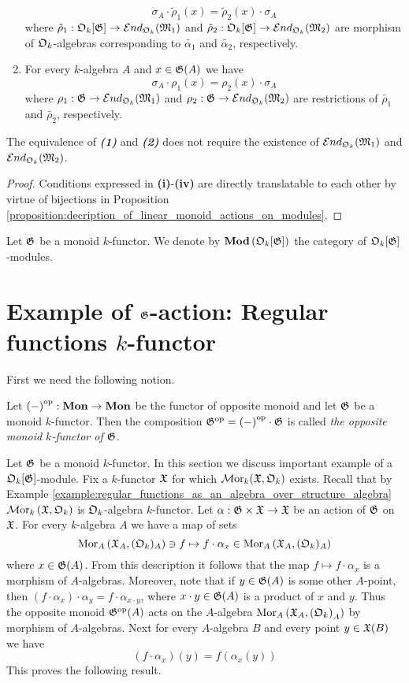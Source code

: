 \begin{proposition}
\begin{enumerate}[label=\emph{\textbf{(\roman*)}}, leftmargin=1.5em]
$$\sigma_A \cdot \tilde{\rho}_1(x) = \tilde{\rho}_2(x) \cdot \sigma_A$$
where $\tilde{\rho}_1:{\mathfrak O}_k[{\mathfrak G}] \rightarrow {\mathcal E} nd_{{\mathfrak O}_k}({\mathfrak M}_1)$ and $\tilde{\rho}_2:{\mathfrak O}_k[{\mathfrak G}] \rightarrow {\mathcal E} nd_{{\mathfrak O}_k}({\mathfrak M}_2)$ are morphism of ${\mathfrak O}_k$-algebras corresponding to $\tilde{\alpha_1}$ and $\tilde{\alpha_2}$, respectively.
\item For every $k$-algebra $A$ and $x\in {\mathfrak G}(A)$ we have
$$\sigma_A \cdot \rho_1(x) = \rho_2(x) \cdot \sigma_A$$
where $\rho_1:{\mathfrak G} \rightarrow {\mathcal E} nd_{{\mathfrak O}_k}({\mathfrak M}_1)$ and $\rho_2:{\mathfrak G} \rightarrow {\mathcal E} nd_{{\mathfrak O}_k}({\mathfrak M}_2)$ are restrictions of $\tilde{\rho_1}$ and $\tilde{\rho_2}$, respectively.
\end{enumerate}
The equivalence of \emph{\textbf{(1)}} and \emph{\textbf{(2)}} does not require the existence of ${\mathcal E} nd_{{\mathfrak O}_k}({\mathfrak M}_1)$ and ${\mathcal E} nd_{{\mathfrak O}_k}({\mathfrak M}_2)$.
\end{proposition}
\begin{proof}
Conditions expressed in \textbf{(i)}-\textbf{(iv)} are directly translatable to each other by virtue of bijections in Proposition \ref{proposition:decription_of_linear_monoid_actions_on_modules}. 
\end{proof}
\noindent
Let ${\mathfrak G}$ be a monoid $k$-functor. We denote by $\mathbf{Mod}\left({\mathfrak O}_k[{\mathfrak G}]\right)$ the category of ${\mathfrak O}_k[{\mathfrak G}]$-modules.

\section{Example of ${\mathfrak G}$-action: Regular functions $k$-functor}
\noindent
First we need the following notion.

\begin{definition}
Let $\left(-\right)^{\mathrm{op}}:\mathbf{Mon} \rightarrow \mathbf{Mon}$ be the functor of opposite monoid and let ${\mathfrak G}$ be a monoid $k$-functor. Then the composition ${\mathfrak G}^{\mathrm{op}} = \left(-\right)^{\mathrm{op}}\cdot {\mathfrak G}$ is called \textit{the opposite monoid $k$-functor of ${\mathfrak G}$}.
\end{definition}
\noindent
Let ${\mathfrak G}$ be a monoid $k$-functor. In this section we discuss important example of a ${\mathfrak O}_k[{\mathfrak G}]$-module. Fix a $k$-functor ${\mathfrak X}$ for which $\mathcal{M}\mathrm{or}_k({\mathfrak X},{\mathfrak O}_k)$ exists. Recall that by Example \ref{example:regular_functions_as_an_algebra_over_structure_algebra} $\mathcal{M}\mathrm{or}_k\left({\mathfrak X},{\mathfrak O}_k\right)$ is ${\mathfrak O}_k$-algebra $k$-functor. Let $\alpha:{\mathfrak G}\times {\mathfrak X}\rightarrow {\mathfrak X}$ be an action of ${\mathfrak G}$ on ${\mathfrak X}$. For every $k$-algebra $A$  we have a map of sets
$$\mathrm{Mor}_A\left({\mathfrak X}_A,({\mathfrak O}_k)_A\right) \ni f\mapsto f\cdot \alpha_x\in \mathrm{Mor}_A\left({\mathfrak X}_A,({\mathfrak O}_k)_A\right)$$
where $x\in {\mathfrak G}(A)$. From this description it follows that the map $f\mapsto f\cdot \alpha_x$ is a morphism of $A$-algebras. Moreover, note that if $y\in {\mathfrak G}(A)$ is some other $A$-point, then $\left(f\cdot \alpha_x\right)\cdot \alpha_y = f\cdot \alpha_{x\cdot y}$, where $x\cdot y \in {\mathfrak G}(A)$ is a product of $x$ and $y$. Thus the opposite monoid ${\mathfrak G}^{\mathrm{op}}(A)$ acts on the $A$-algebra $\mathrm{Mor}_A\left({\mathfrak X}_A,\left({\mathfrak O}_k\right)_A\right)$ by morphism of $A$-algebras. Next for every $A$-algebra $B$ and every point $y\in {\mathfrak X}(B)$ we have
$$(f\cdot \alpha_x)(y) = f\left(\alpha_x(y)\right)$$
This proves the following result.

